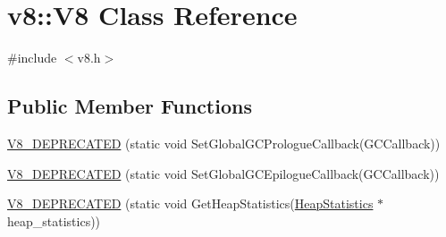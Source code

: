 \hypertarget{classv8_1_1_v8}{}\section{v8\+:\+:V8 Class Reference}
\label{classv8_1_1_v8}


{\ttfamily \#include $<$v8.\+h$>$}

\subsection*{Public Member Functions}
\begin{DoxyCompactItemize}
\item 
\hyperlink{classv8_1_1_v8_a2db298c4c02b6b1fb14997d97e918ab3}{V8\+\_\+\+D\+E\+P\+R\+E\+C\+A\+T\+E\+D} (static void Set\+Global\+G\+C\+Prologue\+Callback(G\+C\+Callback))
\item 
\hyperlink{classv8_1_1_v8_a3adcae2030e176ad13e4830e0939af5f}{V8\+\_\+\+D\+E\+P\+R\+E\+C\+A\+T\+E\+D} (static void Set\+Global\+G\+C\+Epilogue\+Callback(G\+C\+Callback))
\item 
\hyperlink{classv8_1_1_v8_acc6dfa7e89246205e5e82ade6b513be1}{V8\+\_\+\+D\+E\+P\+R\+E\+C\+A\+T\+E\+D} (static void Get\+Heap\+Statistics(\hyperlink{classv8_1_1_heap_statistics}{Heap\+Statistics} $\ast$heap\+\_\+statistics))
\end{DoxyCompactItemize}
